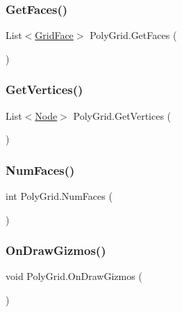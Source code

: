 \mbox{\label{class_poly_grid_a4fd6191d005e389d329fc5f855732015}} 
\subsubsection{\texorpdfstring{Get\+Faces()}{GetFaces()}}
{\footnotesize\ttfamily List$<$\mbox{\hyperlink{class_grid_face}{Grid\+Face}}$>$ Poly\+Grid.\+Get\+Faces (\begin{DoxyParamCaption}{ }\end{DoxyParamCaption})}

\mbox{\label{class_poly_grid_a35e759e3c28917350c1158e80a664a79}} 
\subsubsection{\texorpdfstring{Get\+Vertices()}{GetVertices()}}
{\footnotesize\ttfamily List$<$\mbox{\hyperlink{class_node}{Node}}$>$ Poly\+Grid.\+Get\+Vertices (\begin{DoxyParamCaption}{ }\end{DoxyParamCaption})}

\mbox{\label{class_poly_grid_abdcb8932a005a5cbd833430662727faf}} 
\subsubsection{\texorpdfstring{Num\+Faces()}{NumFaces()}}
{\footnotesize\ttfamily int Poly\+Grid.\+Num\+Faces (\begin{DoxyParamCaption}{ }\end{DoxyParamCaption})}

\mbox{\label{class_poly_grid_a1c99b63c71be2e28b2f1b1ccdbdf1c26}} 
\subsubsection{\texorpdfstring{On\+Draw\+Gizmos()}{OnDrawGizmos()}}
{\footnotesize\ttfamily void Poly\+Grid.\+On\+Draw\+Gizmos (\begin{DoxyParamCaption}{ }\end{DoxyParamCaption})}



